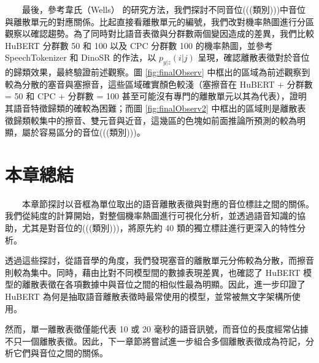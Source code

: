 　　最後，參考韋氏（Wells） \cite{wells_phonetic_2022} 的研究方法，我們探討不同音位(((類別)))中音位與離散單元的對應關係。比起直接看離散單元的編號，我們改對機率熱圖進行分區觀察以確認趨勢。為了同時對比語音表徵與分群數兩個變因造成的差異，我們比較 HuBERT 分群數 50 和 100 以及 CPC 分群數 100 的機率熱圖，並參考 SpeechTokenizer \cite{zhang2024speechtokenizer} 和 DinoSR \cite{liu2024dinosr} 的作法，以 $p_{y|z}(i|j)$ 呈現，確認離散表徵對於音位的歸類效果，最終驗證前述觀察。圖 \ref{fig:finalObserv} 中框出的區域為前述觀察到較為分散的塞音與塞擦音，這些區域確實顏色較淺（塞擦音在 HuBERT + 分群數 = 50 和 CPC + 分群數 = 100 甚至可能沒有專門的離散單元以其為代表），證明其語音特徵歸類的確較為困難；而圖 \ref{fig:finalObserv2} 中框出的區域則是離散表徵歸類較集中的擦音、雙元音與近音，這幾區的色塊如前面推論所預測的較為明顯，屬於容易區分的音位(((類別)))。


\section{本章總結}          %

　　本章節探討以音框為單位取出的語音離散表徵與對應的音位標註之間的關係。我們從純度的計算開始，對整個機率熱圖進行可視化分析，並透過語音知識的協助，尤其是對音位的(((類別)))，將原先約 40 類的獨立標註進行更深入的特性分析。

        透過這些探討，從語音學的角度，我們發現塞音的離散單元分佈較為分散，而擦音則較為集中。同時，藉由比對不同模型間的數據表現差異，也確認了 HuBERT 模型的離散表徵在各項數據中與音位之間的相似性最為明顯。因此，進一步印證了 HuBERT 為何是抽取語音離散表徵時最常使用的模型，並常被無文字架構所使用。

        然而，單一離散表徵僅能代表 10 或 20 毫秒的語音訊號，而音位的長度經常佔據不只一個離散表徵。因此，下一章節將嘗試進一步組合多個離散表徵成為符記，分析它們與音位之間的關係。


